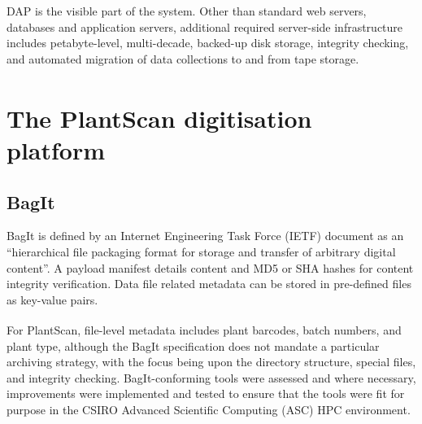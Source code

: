 \documentclass{llncs}
\begin{document}
DAP is the visible part of the system. Other than standard web servers,
databases and application servers, additional required server-side
infrastructure includes petabyte-level, multi-decade, backed-up disk storage,
integrity checking, and automated migration of data collections to and from tape
storage.

\section{The PlantScan\textsuperscript{\texttrademark} digitisation platform}


\subsection{BagIt}

BagIt is defined by an Internet Engineering Task Force (IETF) document as an
``hierarchical file packaging format for storage and transfer of arbitrary
digital content''\cite{Kunze2011}. A payload manifest details content and MD5 or SHA hashes
for content integrity verification. Data file related metadata can be stored in
pre-defined files as key-value pairs. 

For PlantScan\textsuperscript{\texttrademark}, file-level metadata
includes plant barcodes, batch numbers, and plant type, although the BagIt
specification does not mandate a particular archiving strategy, with the
focus being upon the directory structure, special files, and integrity checking.
BagIt-conforming tools \cite{Summers} \cite{LoCBagger} were assessed and where necessary,
improvements were implemented and tested to ensure that the tools were fit for purpose in the CSIRO Advanced Scientific Computing (ASC) HPC environment.
\end{document}
